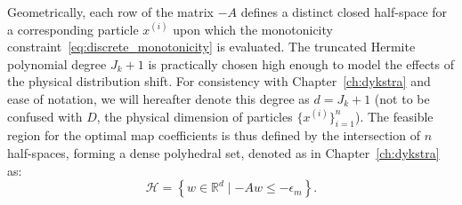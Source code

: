 Geometrically, each row of the matrix $-A$ defines a distinct closed half-space for a corresponding particle ${x^{(i)}}$ upon which the monotonicity constraint~\eqref{eq:discrete_monotonicity} is evaluated. The truncated Hermite polynomial degree $J_k+1$ is practically chosen high enough to model the effects of the physical distribution shift. For consistency with Chapter~\ref{ch:dykstra} and ease of notation, we will hereafter denote this degree as $d = J_k+1$ (not to be confused with $D$, the physical dimension of particles $\{x^{(i)}\}_{i=1}^n$). The feasible region for the optimal map coefficients is thus defined by the intersection of $n$ half-spaces, forming a dense polyhedral set, denoted as in Chapter~\ref{ch:dykstra} as:
\begin{equation}
    \mathcal{H} = \left\{ w \in \mathbb{R}^{d} \mid -A w \le -\epsilon_m \right\}.
    \label{eq:polyhedral_set}
\end{equation}